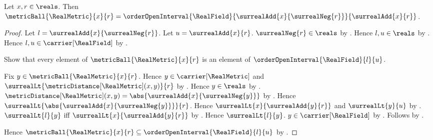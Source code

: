 \begin{theorem}\label{real_metric_ball_eq_order_open_interval}
    Let $x,r\in\reals$.
    Then $\metricBall{\RealMetric}{x}{r}
        =\orderOpenInterval{\RealField}
            {\surrealAdd{x}{\surrealNeg{r}}}{\surrealAdd{x}{r}}$.
\end{theorem}
\begin{proof}
    Let $l=\surrealAdd{x}{\surrealNeg{r}}$.
    Let $u=\surrealAdd{x}{r}$.
    $\surrealNeg{r}\in\reals$ by .
    Hence $l,u\in\reals$ by .
    Hence $l,u\in\carrier[\RealField]$ by
        .

    Show that every element of $\metricBall{\RealMetric}{x}{r}$ is an
        element of $\orderOpenInterval{\RealField}{l}{u}$.
    \begin{subproof}
        Fix $y\in\metricBall{\RealMetric}{x}{r}$.
        Hence $y\in\carrier[\RealMetric]$ and
            $\surrealLt{\metricDistance[\RealMetric](x,y)}{r}$ by
            .
        Hence $y\in\reals$ by .
        $\metricDistance[\RealMetric](x,y)
            =\abs{\surrealAdd{x}{\surrealNeg{y}}}$ by
            .
        Hence $\surrealLt
            {\abs{\surrealAdd{x}{\surrealNeg{y}}}}{r}$.
        Hence $\surrealLt{x}{\surrealAdd{y}{r}}$ and
            $\surrealLt{y}{u}$ by
            .
        $\surrealLt{l}{y}$ iff
            $\surrealLt{x}{\surrealAdd{y}{r}}$ by
            .
        Hence $\surrealLt{l}{y}$.
        $y\in\carrier[\RealField]$ by
            .
        Follows by
            .
    \end{subproof}
    Hence $\metricBall{\RealMetric}{x}{r}\subseteq
        \orderOpenInterval{\RealField}{l}{u}$ by .


\end{proof}
